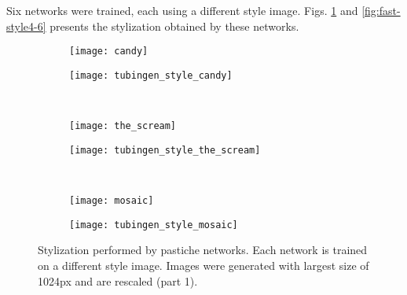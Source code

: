 Six networks were trained, each using a different style image. Figs. \ref{fig:fast-style1-3} and \ref{fig:fast-style4-6} presents the stylization obtained by these networks.

\begin{figure}
	\centering
	\begin{subfigure}[t]{0.25\textwidth}
		\vskip 0pt
		\texttt{[image: candy]}
	\end{subfigure}
	\begin{subfigure}[t]{0.7\textwidth}
		\vskip 0pt
		\texttt{[image: tubingen\_style\_candy]}
	\end{subfigure}\\
	\begin{subfigure}[t]{0.25\textwidth}
	\vskip 0pt
	\texttt{[image: the\_scream]}
	\end{subfigure}
	\begin{subfigure}[t]{0.7\textwidth}
		\vskip 0pt
		\texttt{[image: tubingen\_style\_the\_scream]}
	\end{subfigure}\\
		\begin{subfigure}[t]{0.25\textwidth}
		\vskip 0pt
		\texttt{[image: mosaic]}
	\end{subfigure}
	\begin{subfigure}[t]{0.7\textwidth}
		\vskip 0pt
		\texttt{[image: tubingen\_style\_mosaic]}
	\end{subfigure}
	\caption[Stylization performed by pastiche networks.]{Stylization performed by pastiche networks. Each network is trained on a different style image. Images were generated with largest size of 1024px and are rescaled (part 1).\label{fig:fast-style1-3}}
\end{figure}

